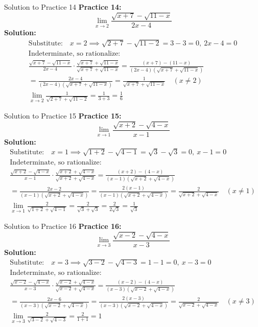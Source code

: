 \documentclass[aspectratio=169]{beamer}
\begin{document}
\begin{frame}{Solution to Practice 14}
\textbf{Practice 14:}
\[
\lim_{x \to 2} \frac{\sqrt{x+7}-\sqrt{11-x}}{2x-4}
\]
\textbf{Solution:}
\begin{align*}
\text{Substitute:}\quad x=2 \implies \sqrt{2+7}-\sqrt{11-2}=3-3=0,\ 2x-4=0 \\
\text{Indeterminate, so rationalize:} \\
\frac{\sqrt{x+7}-\sqrt{11-x}}{2x-4} \cdot \frac{\sqrt{x+7}+\sqrt{11-x}}{\sqrt{x+7}+\sqrt{11-x}} = \frac{(x+7)-(11-x)}{(2x-4)(\sqrt{x+7}+\sqrt{11-x})} \\
= \frac{2x-4}{(2x-4)(\sqrt{x+7}+\sqrt{11-x})} = \frac{1}{\sqrt{x+7}+\sqrt{11-x}} \quad (x \neq 2) \\
\lim_{x \to 2} \frac{1}{\sqrt{2+7}+\sqrt{11-2}} = \frac{1}{3+3} = \frac{1}{6}
\end{align*}
\end{frame}

\begin{frame}{Solution to Practice 15}
\textbf{Practice 15:}
\[
\lim_{x \to 1} \frac{\sqrt{x+2}-\sqrt{4-x}}{x-1}
\]
\textbf{Solution:}
\begin{align*}
\text{Substitute:}\quad x=1 \implies \sqrt{1+2}-\sqrt{4-1}=\sqrt{3}-\sqrt{3}=0,\ x-1=0 \\
\text{Indeterminate, so rationalize:} \\
\frac{\sqrt{x+2}-\sqrt{4-x}}{x-1} \cdot \frac{\sqrt{x+2}+\sqrt{4-x}}{\sqrt{x+2}+\sqrt{4-x}} = \frac{(x+2)-(4-x)}{(x-1)(\sqrt{x+2}+\sqrt{4-x})} \\
= \frac{2x-2}{(x-1)(\sqrt{x+2}+\sqrt{4-x})} = \frac{2(x-1)}{(x-1)(\sqrt{x+2}+\sqrt{4-x})} = \frac{2}{\sqrt{x+2}+\sqrt{4-x}} \quad (x \neq 1) \\
\lim_{x \to 1} \frac{2}{\sqrt{1+2}+\sqrt{4-1}} = \frac{2}{\sqrt{3}+\sqrt{3}} = \frac{2}{2\sqrt{3}} = \frac{1}{\sqrt{3}}
\end{align*}
\end{frame}

\begin{frame}{Solution to Practice 16}
\textbf{Practice 16:}
\[
\lim_{x \to 3} \frac{\sqrt{x-2}-\sqrt{4-x}}{x-3}
\]
\textbf{Solution:}
\begin{align*}
\text{Substitute:}\quad x=3 \implies \sqrt{3-2}-\sqrt{4-3}=1-1=0,\ x-3=0 \\
\text{Indeterminate, so rationalize:} \\
\frac{\sqrt{x-2}-\sqrt{4-x}}{x-3} \cdot \frac{\sqrt{x-2}+\sqrt{4-x}}{\sqrt{x-2}+\sqrt{4-x}} = \frac{(x-2)-(4-x)}{(x-3)(\sqrt{x-2}+\sqrt{4-x})} \\
= \frac{2x-6}{(x-3)(\sqrt{x-2}+\sqrt{4-x})} = \frac{2(x-3)}{(x-3)(\sqrt{x-2}+\sqrt{4-x})} = \frac{2}{\sqrt{x-2}+\sqrt{4-x}} \quad (x \neq 3) \\
\lim_{x \to 3} \frac{2}{\sqrt{3-2}+\sqrt{4-3}} = \frac{2}{1+1} = 1
\end{align*}
\end{frame}
\end{document}
